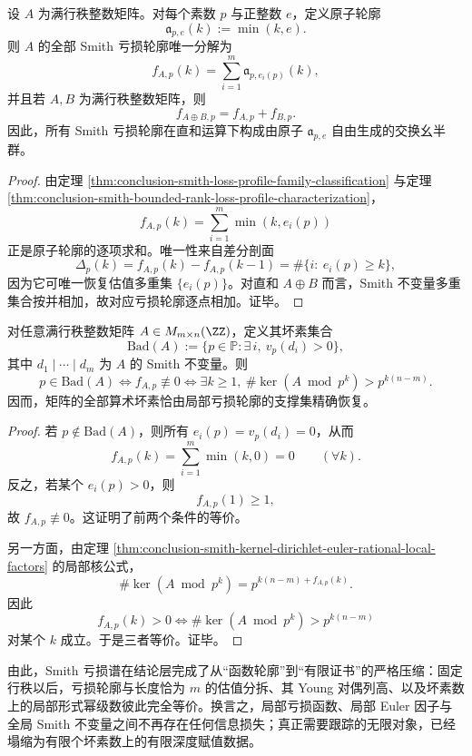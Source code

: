 \begin{corollary}\label{cor:conclusion-smith-loss-euler-atomic-decomposition}
设 \(A\) 为满行秩整数矩阵。对每个素数 \(p\) 与正整数 \(e\)，定义原子轮廓
\[
\mathfrak a_{p,e}(k):=\min(k,e).
\]
则 \(A\) 的全部 Smith 亏损轮廓唯一分解为
\[
f_{A,p}(k)=\sum_{i=1}^m \mathfrak a_{p,e_i(p)}(k),
\]
并且若 \(A,B\) 为满行秩整数矩阵，则
\[
f_{A\oplus B,p}=f_{A,p}+f_{B,p}.
\]
因此，所有 Smith 亏损轮廓在直和运算下构成由原子 \(\mathfrak a_{p,e}\) 自由生成的交换幺半群。
\end{corollary}
\begin{proof}
由定理 \ref{thm:conclusion-smith-loss-profile-family-classification} 与定理 \ref{thm:conclusion-smith-bounded-rank-loss-profile-characterization}，
\[
f_{A,p}(k)=\sum_{i=1}^m \min(k,e_i(p))
\]
正是原子轮廓的逐项求和。唯一性来自差分剖面
\[
\Delta_p(k)=f_{A,p}(k)-f_{A,p}(k-1)=\#\{i:\ e_i(p)\ge k\},
\]
因为它可唯一恢复估值多重集 \(\{e_i(p)\}\)。对直和 \(A\oplus B\) 而言，Smith 不变量多重集合按并相加，故对应亏损轮廓逐点相加。证毕。
\end{proof}

\begin{proposition}[坏素集合的亏损谱刻画]\label{prop:conclusion-smith-bad-prime-loss-support}
对任意满行秩整数矩阵 \(A\in M_{m\times n}(\ZZ)\)，定义其坏素集合
\[
\mathrm{Bad}(A):=\{p\in\mathbb P:\exists\, i,\ v_p(d_i)>0\},
\]
其中 \(d_1\mid\cdots\mid d_m\) 为 \(A\) 的 Smith 不变量。则
\[
p\in \mathrm{Bad}(A)
\iff
f_{A,p}\not\equiv 0
\iff
\exists k\ge 1,\ \#\ker(A\bmod p^k)>p^{k(n-m)}.
\]
因而，矩阵的全部算术坏素恰由局部亏损轮廓的支撑集精确恢复。
\end{proposition}
\begin{proof}
若 \(p\notin \mathrm{Bad}(A)\)，则所有 \(e_i(p)=v_p(d_i)=0\)，从而
\[
f_{A,p}(k)=\sum_{i=1}^m \min(k,0)=0
\qquad(\forall k).
\]
反之，若某个 \(e_i(p)>0\)，则
\[
f_{A,p}(1)\ge 1,
\]
故 \(f_{A,p}\not\equiv0\)。这证明了前两个条件的等价。

另一方面，由定理 \ref{thm:conclusion-smith-kernel-dirichlet-euler-rational-local-factors} 的局部核公式，
\[
\#\ker(A\bmod p^k)=p^{k(n-m)+f_{A,p}(k)}.
\]
因此
\[
f_{A,p}(k)>0
\iff
\#\ker(A\bmod p^k)>p^{k(n-m)}
\]
对某个 \(k\) 成立。于是三者等价。证毕。
\end{proof}



\noindent
由此，Smith 亏损谱在结论层完成了从“函数轮廓”到“有限证书”的严格压缩：固定行秩以后，亏损轮廓与长度恰为 \(m\) 的估值分拆、其 Young 对偶列高、以及坏素数上的局部形式幂级数彼此完全等价。换言之，局部亏损函数、局部 Euler 因子与全局 Smith 不变量之间不再存在任何信息损失；真正需要跟踪的无限对象，已经塌缩为有限个坏素数上的有限深度赋值数据。

\endinput

